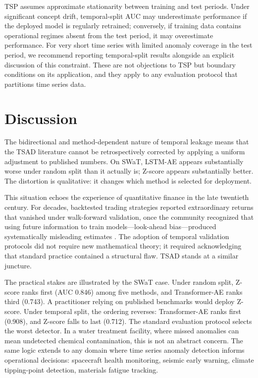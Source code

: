 \documentclass[preprint,12pt]{elsarticle}
\begin{document}
TSP assumes approximate stationarity between training and test periods. Under significant concept drift, temporal-split AUC may underestimate performance if the deployed model is regularly retrained; conversely, if training data contains operational regimes absent from the test period, it may overestimate performance. For very short time series with limited anomaly coverage in the test period, we recommend reporting temporal-split results alongside an explicit discussion of this constraint. These are not objections to TSP but boundary conditions on its application, and they apply to any evaluation protocol that partitions time series data.

\section{Discussion}
\label{sec:discussion}

The bidirectional and method-dependent nature of temporal leakage means that the TSAD literature cannot be retrospectively corrected by applying a uniform adjustment to published numbers. On SWaT, LSTM-AE appears substantially worse under random split than it actually is; Z-score appears substantially better. The distortion is qualitative: it changes which method is selected for deployment.

This situation echoes the experience of quantitative finance in the late twentieth century. For decades, backtested trading strategies reported extraordinary returns that vanished under walk-forward validation, once the community recognized that using future information to train models---look-ahead bias---produced systematically misleading estimates \cite{bailey2014pseudo,deprado2018advances}. The adoption of temporal validation protocols did not require new mathematical theory; it required acknowledging that standard practice contained a structural flaw. TSAD stands at a similar juncture.

The practical stakes are illustrated by the SWaT case. Under random split, Z-score ranks first (AUC 0.846) among five methods, and Transformer-AE ranks third (0.743). A practitioner relying on published benchmarks would deploy Z-score. Under temporal split, the ordering reverses: Transformer-AE ranks first (0.908), and Z-score falls to last (0.712). The standard evaluation protocol selects the worst detector. In a water treatment facility, where missed anomalies can mean undetected chemical contamination, this is not an abstract concern. The same logic extends to any domain where time series anomaly detection informs operational decisions: spacecraft health monitoring, seismic early warning, climate tipping-point detection, materials fatigue tracking.
\end{document}
